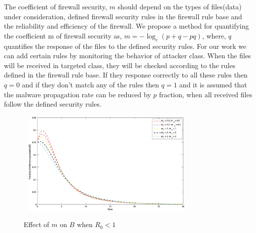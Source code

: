 \documentclass[conference]{IEEEtran}
\begin{document}
\indent The coefficient of firewall security, $m$ should depend on the types of files(data) under consideration, defined firewall security rules in the firewall rule base and the reliability and efficiency of the firewall. We propose a method for quantifying the coefficient m of firewall security as, $m=-{\log_e (p+q-pq)}$, where, $q$ quantifies the response of the files to the defined security rules.
For our work we can add certain rules by monitoring the behavior of attacker class. When the files will be received in targeted class, they will be checked according to the rules defined in the firewall rule base. If they response correctly to all these rules then $q=0$ and if they don't match any of the rules then $q=1$ and it is assumed that the malware propagation rate can be reduced by $p$ fraction, when all received files follow the defined security rules.

\begin{figure}
\centering
  \includegraphics[width=3.5in,height=2.0in]{mB1.eps}\\
  \caption{Effect of $m$ on $B$ when $R_0<1$}\label{fig:ff3}
\end{figure}
\end{document}
